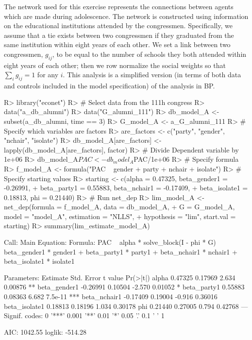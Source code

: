 \documentclass[nojss]{jss}
\begin{document}
	The network used for this exercise represents the connections between agents which are made during adolescence. The network is constructed using information on the educational institutions attended by the congressmen. Specifically, we assume that a tie exists between two congressmen if they graduated from the same institution within eight years of each other. We set a link between two congressmen, $g_{ij}$, to be equal to the number of schools they both attended within eight years of each other; then we row normalize the social weights so that $\sum_{i}g_{ij}=1$ for any $i$. This analysis is a simplified version (in terms of both data and controls included in the model specification) of the analysis in BP.
	\begin{CodeChunk}
		\begin{CodeInput}
			R> library("econet")
			R> # Select data from the 111h congress
			R> data("a_db_alumni")
			R> data("G_alumni_111")
			R> db_model_A <- subset(a_db_alumni, time == 3)
			R> G_model_A <- a_G_alumni_111
			R> # Specify which variables are factors
			R> are_factors <- c("party", "gender", "nchair", "isolate")
			R> db_model_A[are_factors] <- lapply(db_model_A[are_factors], factor)
			R> # Divide Dependent variable by 1e+06
			R> db_model_A$PAC <- db_model_A$PAC/1e+06
			R> # Specify formula
			R> f_model_A <- formula("PAC ~ gender + party + nchair + isolate")
			R> # Specify starting values
			R> starting <- c(alpha = 0.47325, beta_gender1 = -0.26991,
			+    beta_party1 = 0.55883, beta_nchair1 = -0.17409,
			+    beta_isolate1 = 0.18813, phi = 0.21440)
			R> # Run net_dep
			R> lim_model_A <- net_dep(formula = f_model_A, data = db_model_A,
			+    G = G_model_A, model = "model_A", estimation = "NLLS",
			+    hypothesis = "lim", start.val = starting)
			R> summary(lim_estimate_model_A)
		\end{CodeInput}
		\begin{CodeOutput}
			Call:
			Main Equation:  
			Formula: PAC ~ alpha * solve_block(I - phi * G) %
			beta_gender1 * gender1 + beta_party1 * party1 + 
			beta_nchair1 * nchair1 + beta_isolate1 * isolate1
			
			Parameters:
			Estimate Std. Error t value Pr(>|t|)    
			alpha          0.47325    0.17969   2.634  0.00876 ** 
			beta_gender1  -0.26991    0.10504  -2.570  0.01052 *  
			beta_party1    0.55883    0.08363   6.682  7.5e-11 ***
			beta_nchair1  -0.17409    0.19004  -0.916  0.36016    
			beta_isolate1  0.18813    0.18196   1.034  0.30178    
			phi            0.21440    0.27005   0.794  0.42768    
			---
			Signif. codes:  0 '***' 0.001 '**' 0.01 '*' 0.05 '.' 0.1 ' ' 1
			
			AIC: 1042.55  loglik: -514.28
		\end{CodeOutput}
	\end{CodeChunk}
\end{document}
